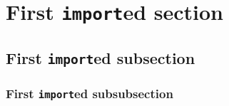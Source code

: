 \Blindtext

\section{First \texttt{import}ed section}
\Blindtext

\subsection{First \texttt{import}ed subsection}
\Blindtext

\subsubsection{First \texttt{import}ed subsubsection}

\Blindtext